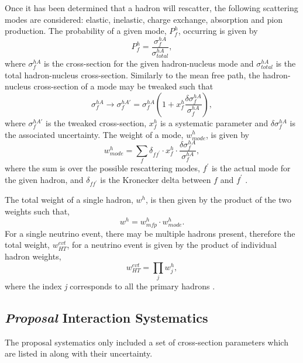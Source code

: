 Once it has been determined that a hadron will rescatter, the following scattering modes are considered: elastic, inelastic, charge exchange, absorption and pion production. The probability of a given mode, $P_f^h$, occurring is given by
\begin{equation}
    P_f^h = \frac{\sigma_f^{hA}}{\sigma_{total}^{hA}},
\end{equation}
where $\sigma_f^{hA}$ is the cross-section for the given hadron-nucleus mode and $\sigma_{total}^{hA}$ is the total hadron-nucleus cross-section. Similarly to the mean free path, the hadron-nucleus cross-section of a mode may be tweaked such that
\begin{equation}
    \sigma_f^{hA} \rightarrow \sigma_f^{hA\prime} = \sigma_f^{hA}\left(1 + x_f^h \frac{\delta\sigma_f^{hA}}{\sigma_f^{hA}}\right),
\end{equation}
where $\sigma_f^{hA\prime}$ is the tweaked cross-section, $x_f^h$ is a systematic parameter and $\delta\sigma_f^{hA}$ is the associated uncertainty. The weight of a mode, $w^h_{mode}$, is given by
\begin{equation}
    w^h_{mode} = \sum_f \delta_{ff^\prime} \cdot x^h_f \cdot \frac{\delta \sigma_f^{hA}}{\sigma_f^{hA}},
\end{equation}
where the sum is over the possible rescattering modes, $f^\prime$ is the actual mode for the given hadron, and $\delta_{ff^\prime}$ is the Kronecker delta between $f$ and $f^\prime$ \cite{GENIE_manual}. 

The total weight of a single hadron, $w^h$, is then given by the product of the two weights such that,
\begin{equation}
    w^h = w^h_{mfp} \cdot w^h_{mode}.
\end{equation}
For a single neutrino event, there may be multiple hadrons present, therefore the total weight, $w^{evt}_{HT}$, for a neutrino event is given by the product of individual hadron weights,
\begin{equation}
    w_{HT}^{evt} = \prod_j w_j^h,
\end{equation}
where the index \textit{j} corresponds to all the primary hadrons \cite{GENIE_manual}.

\subsection*{\textit{Proposal} Interaction Systematics}

The proposal systematics only included a set of cross-section parameters which are listed in  along with their uncertainty. 

